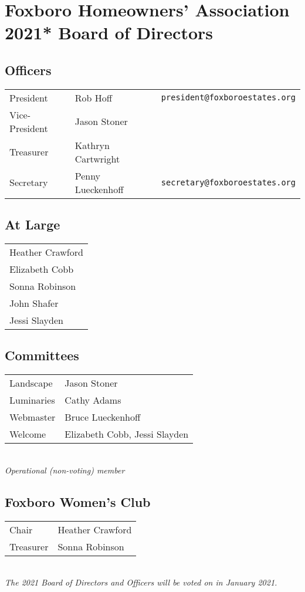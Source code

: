 \section{Foxboro Homeowners’ Association 2021* Board of Directors}

\subsection{Officers}
\begin{tabular}{lll}
	President & Rob Hoff & \verb'president@foxboroestates.org' \\
	Vice-President & Jason Stoner & \\
	Treasurer & Kathryn Cartwright & \\
	Secretary & Penny Lueckenhoff & \verb'secretary@foxboroestates.org' \\
\end{tabular}


\subsection{At Large}
\begin{tabular}{l}
	Heather Crawford \\
	Elizabeth Cobb \\
	Sonna Robinson \\
	John Shafer \\
	Jessi Slayden \\
\end{tabular}

\subsection{Committees}
\begin{tabular}{ll}
	Landscape & Jason Stoner \\
	Luminaries & Cathy Adams\dag \\
	Webmaster & Bruce Lueckenhoff\dag \\
	Welcome	& Elizabeth Cobb, Jessi Slayden \\
\end{tabular}
\\

{\it \dag Operational (non-voting) member }

\subsection{Foxboro Women’s Club}
\begin{tabular}{ll}
	Chair & Heather Crawford \\
	Treasurer & Sonna Robinson \\
\end{tabular}
\\

{\it *The 2021 Board of Directors and Officers will be voted on in
January 2021. }

